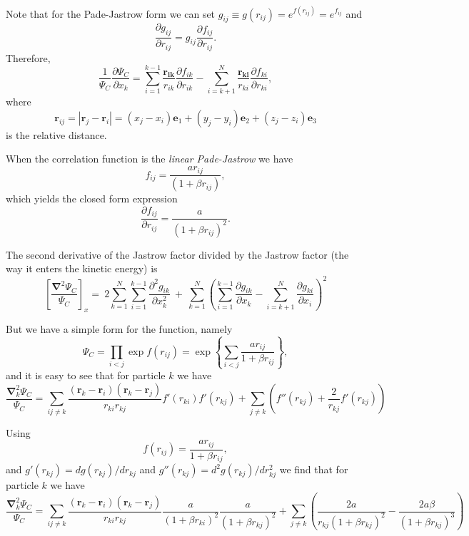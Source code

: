 \documentclass[graybox,sectrefs,envcountresetchap,open=right]{svmonodo}
\begin{document}
Note that for the Pade-Jastrow form we can set $g_{ij} \equiv g(r_{ij}) = e^{f(r_{ij})} = e^{f_{ij}}$ and 
\[
\frac{\partial g_{ij}}{\partial r_{ij}} = g_{ij} \frac{\partial f_{ij}}{\partial r_{ij}}.
\]
Therefore, 
\[
\frac{1}{\Psi_{C}}\frac{\partial \Psi_{C}}{\partial x_k} =
\sum_{i=1}^{k-1}\frac{\mathbf{r_{ik}}}{r_{ik}}\frac{\partial f_{ik}}{\partial r_{ik}}
-\sum_{i=k+1}^{N}\frac{\mathbf{r_{ki}}}{r_{ki}}\frac{\partial f_{ki}}{\partial r_{ki}},
\]
where 
\[
 \mathbf{r}_{ij} = |\mathbf{r}_j - \mathbf{r}_i| = (x_j - x_i)\mathbf{e}_1 + (y_j - y_i)\mathbf{e}_2 + (z_j - z_i)\mathbf{e}_3
\]
is the relative distance. 






When the correlation function is the \emph{linear Pade-Jastrow} we have
\[
f_{ij} = \frac{a r_{ij}}{(1 + \beta r_{ij})},
\]
which yields the closed form expression
\[
\frac{\partial f_{ij}}{\partial r_{ij}} = \frac{a}{(1 + \beta r_{ij})^2}.
\]






The second derivative of the Jastrow factor divided by the Jastrow factor (the way it enters the kinetic energy) is
\[
\left[\frac{\mathbf{\nabla}^2 \Psi_C}{\Psi_C}\right]_x =\  
2\sum_{k=1}^{N}
\sum_{i=1}^{k-1}\frac{\partial^2 g_{ik}}{\partial x_k^2}\ +\ 
\sum_{k=1}^N
\left(
\sum_{i=1}^{k-1}\frac{\partial g_{ik}}{\partial x_k} -
\sum_{i=k+1}^{N}\frac{\partial g_{ki}}{\partial x_i}
\right)^2
\]





But we have a simple form for the function, namely
\[
\Psi_{C}=\prod_{i< j}\exp{f(r_{ij})}= \exp{\left\{\sum_{i<j}\frac{ar_{ij}}{1+\beta r_{ij}}\right\}},
\]
and it is easy to see that for particle  $k$
we have
\[
  \frac{\mathbf{\nabla}^2_k \Psi_C}{\Psi_C }=
\sum_{ij\ne k}\frac{(\mathbf{r}_k-\mathbf{r}_i)(\mathbf{r}_k-\mathbf{r}_j)}{r_{ki}r_{kj}}f'(r_{ki})f'(r_{kj})+
\sum_{j\ne k}\left( f''(r_{kj})+\frac{2}{r_{kj}}f'(r_{kj})\right)
\]






Using 
\[
f(r_{ij})= \frac{ar_{ij}}{1+\beta r_{ij}},
\]
and $g'(r_{kj})=dg(r_{kj})/dr_{kj}$ and 
$g''(r_{kj})=d^2g(r_{kj})/dr_{kj}^2$  we find that for particle  $k$
we have
\[
  \frac{\mathbf{\nabla}^2_k \Psi_C}{\Psi_C }=
\sum_{ij\ne k}\frac{(\mathbf{r}_k-\mathbf{r}_i)(\mathbf{r}_k-\mathbf{r}_j)}{r_{ki}r_{kj}}\frac{a}{(1+\beta r_{ki})^2}
\frac{a}{(1+\beta r_{kj})^2}+
\sum_{j\ne k}\left(\frac{2a}{r_{kj}(1+\beta r_{kj})^2}-\frac{2a\beta}{(1+\beta r_{kj})^3}\right)
\]
\end{document}
